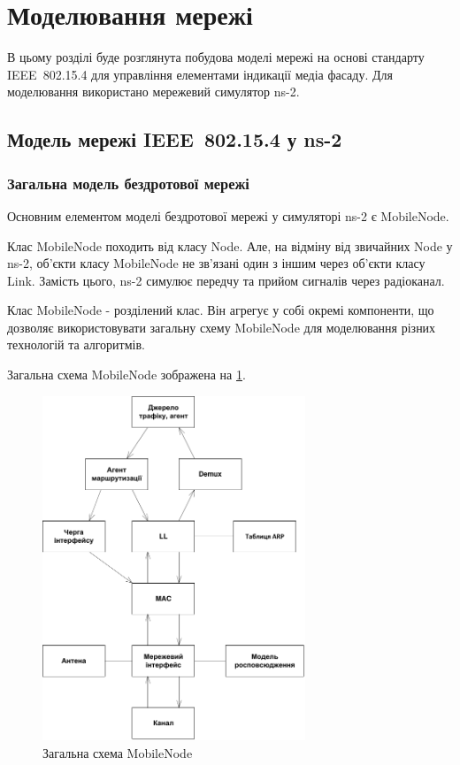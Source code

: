 \documentclass[a4paper,ukrainian,utf8,nocolumnsxix,floatsection,equationsection]{eskdtext}
\renewcommand\paragraph{\subsubsection}
\newcommand{\iee}[0]{IEEE~802.15.4\xspace}
\begin{document}
\section{Моделювання мережі}
\label{sec:simulation}

В цьому розділі буде розглянута побудова моделі мережі на основі стандарту \iee для управління елементами індикації медіа фасаду. Для моделювання використано мережевий симулятор ns-2.

\subsection{Модель мережі \iee у ns-2}

\paragraph{Загальна модель бездротової мережі}

Основним елементом моделі бездротової мережі у симуляторі ns-2 є MobileNode. 

Клас MobileNode походить від класу Node. Але, на відміну від звичайних Node у ns-2, об’єкти класу MobileNode не зв’язані один з іншим через об’єкти класу Link. Замість цього, ns-2 симулює передчу та прийом сигналів через радіоканал.

Клас MobileNode - розділений клас. Він агрегує у собі окремі компоненти, що дозволяє використовувати загальну схему MobileNode для моделювання різних технологій та алгоритмів. 

Загальна схема MobileNode зображена на \ref{fig:mobile_node}.

\begin{figure}[bth]
	\centering
	\includegraphics[width=0.7\textwidth]{img/mobile_node.pdf}
	\caption{\label{fig:mobile_node}Загальна схема MobileNode}
\end{figure}
\end{document}
